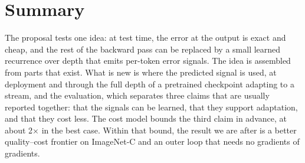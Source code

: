 \documentclass{article}
\begin{document}
\section{Summary}

The proposal tests one idea: at test time, the error at the output is exact and
cheap, and the rest of the backward pass can be replaced by a small learned
recurrence over depth that emits per-token error signals. The idea is assembled
from parts that exist. What is new is where the predicted signal is used, at
deployment and through the full depth of a pretrained checkpoint adapting to a
stream, and the evaluation, which separates three claims that are
usually reported together: that the signals can be learned, that they support
adaptation, and that they cost less. The cost model bounds the third claim in
advance, at about 2$\times$ in the best case. Within that bound, the result we
are after is a better quality--cost frontier on ImageNet-C and an outer loop
that needs no gradients of gradients.

\printbibliography
\end{document}
